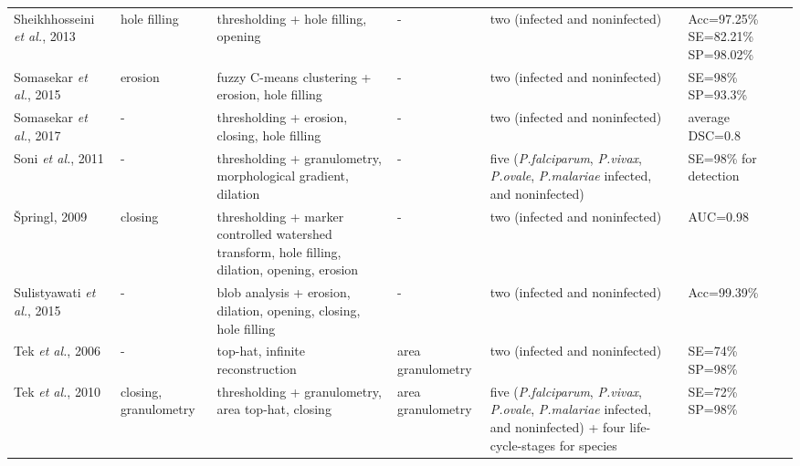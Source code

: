 \begin{longtable}{C{1.4cm} C{1.5cm} C{2.1cm} C{1.5cm} C{2.7cm} C{2.2cm} }
Sheikhhosseini \emph{et al.}, 2013  &
   	hole filling &
   	thresholding + hole filling, opening  &
   	- &
   	two (infected and noninfected) &
   	Acc=97.25\% SE=82.21\% SP=98.02\% \vspace{0.6cm} \\

Somasekar \emph{et al.}, 2015  &
   	erosion &
   	fuzzy C-means clustering + erosion, hole filling  &
   	- &
   	two (infected and noninfected) &
   	SE=98\% SP=93.3\% \vspace{0.6cm} \\

Somasekar \emph{et al.}, 2017  &
   	- &
   	thresholding + erosion, closing, hole filling  &
   	- &
   	two (infected and noninfected) &
   	average DSC=0.8 \vspace{0.6cm} \\

Soni \emph{et al.}, 2011  &
   	- &
   	thresholding + granulometry, morphological gradient, dilation  &
   	- &
   	five (\emph{P.falciparum}, \emph{P.vivax}, \emph{P.ovale}, \emph{P.malariae} infected, and noninfected) &
   	SE=98\% for detection  \vspace{0.6cm} \\

{\v{S}}pringl, 2009  &
   	closing &
   	thresholding + marker controlled watershed transform, hole filling, dilation, opening, erosion  &
   	- &
   	two (infected and noninfected) &
   	AUC=0.98 \vspace{0.6cm} \\

Sulistyawati \emph{et al.}, 2015  &
   	- &
   	blob analysis + erosion, dilation, opening, closing, hole filling  &
   	- &
   	two (infected and noninfected) &
   	Acc=99.39\% \vspace{0.6cm} \\

Tek \emph{et al.}, 2006  &
   	- &
   	top-hat, infinite reconstruction  &
   	area granulometry &
   	two (infected and noninfected) &
   	SE=74\% SP=98\% \vspace{0.6cm} \\

Tek \emph{et al.}, 2010  &
   	closing, granulometry &
   	thresholding + granulometry, area top-hat, closing  &
   	area granulometry &
   	five (\emph{P.falciparum}, \emph{P.vivax}, \emph{P.ovale}, \emph{P.malariae} infected, and noninfected) +
four life-cycle-stages for species &
   	SE=72\% SP=98\% \vspace{0.6cm} \\


\end{longtable}
